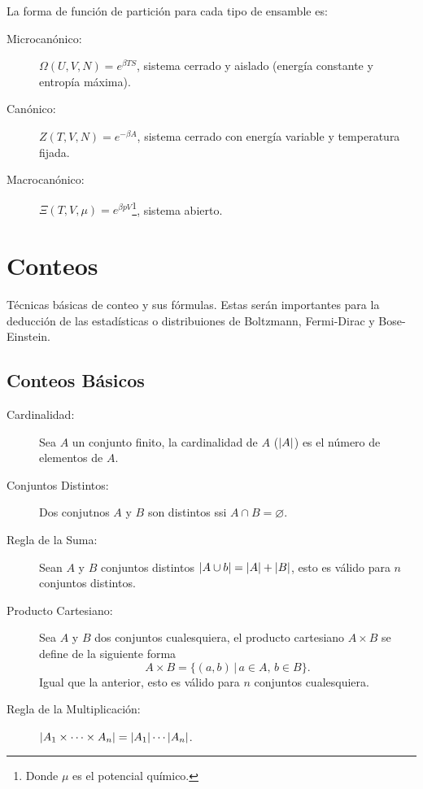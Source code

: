 La forma de función de partición para cada tipo de ensamble es:
\begin{description}
    \item[Microcanónico: ] $\Omega (U,V,N) = e^{\beta TS}$, sistema cerrado y aislado (energía constante y entropía máxima).
    \item[Canónico: ] $Z(T,V,N) = e^{-\beta A}$, sistema cerrado con energía variable y temperatura fijada.
    \item[Macrocanónico: ] $\Xi (T,V,\mu) = e^{\beta pV}$\footnote{Donde $\mu$ es el potencial químico.}, sistema abierto.
\end{description}


\section{Conteos}
Técnicas básicas de conteo y sus fórmulas. Estas serán importantes para la deducción de las estadísticas o distribuiones de Boltzmann, Fermi-Dirac y Bose-Einstein.
\subsection{Conteos Básicos}

\begin{description}
    \item[Cardinalidad: ] Sea $A$ un conjunto finito, la cardinalidad de $A$ ($\abs{A}$) es el número de elementos de $A$. 
    \item[Conjuntos Distintos: ] Dos conjutnos $A$ y $B$ son distintos ssi $A\cap B = \varnothing$.
    \item[Regla de la Suma: ] Sean $A$ y $B$ conjuntos distintos $\abs{A\cup b} = \abs{A} + \abs{B}$, esto es válido para $n$ conjuntos distintos.
    \item[Producto Cartesiano: ] Sea $A$ y $B$ dos conjuntos cualesquiera, el producto cartesiano $A \times  B$ se define de la siguiente forma
        $$ A \times B = \{ (a,b) \, | \, a\in A,\, b\in B \} . $$
        Igual que la anterior, esto es válido para $n$ conjuntos cualesquiera.
    \item[Regla de la Multiplicación: ] $\abs{A_1 \times \cdots \times A_n} = \abs{A_1} \cdots \abs{A_n}$.
\end{description}

